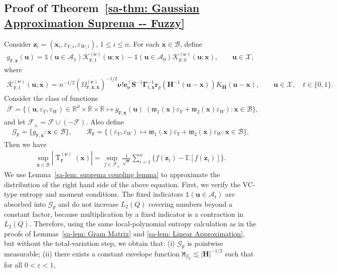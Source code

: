 \documentclass[10pt]{article}
\DeclareMathOperator{\Tstat}{T}
\newcommand{\E}{\mathbb{E}}
\newcommand{\Indicator}{\mathds{1}}
\newcommand{\reals}{\mathbb{R}}
\newcommand{\be}{\mathbf{e}}
\newcommand{\bH}{\mathbf{H}}
\newcommand{\br}{\mathbf{r}}
\newcommand{\bS}{\mathbf{S}}
\newcommand{\bu}{\mathbf{u}}
\newcommand{\bx}{\mathbf{x}}
\newcommand{\bz}{\mathbf{z}}
\newcommand{\bnu}{\boldsymbol{\nu}}
\newcommand{\bGamma}{\boldsymbol{\Gamma}}
\newcommand{\A}{\mathcal{A}}
\newcommand{\B}{\mathcal{B}}
\newcommand{\F}{\mathcal{F}}
\newcommand{\G}{\mathcal{G}}
\newcommand{\K}{\mathscr{K}}
\newcommand{\R}{\mathcal{R}}
\newcommand{\X}{\mathcal{X}}
\newcommand{\ttF}{\mathtt{F}}
\newcommand{\ttM}{\mathtt{M}}
\begin{document}
\subsection{Proof of Theorem~\ref{sa-thm: Gaussian Approximation Suprema -- Fuzzy}}
Consider $\bz_i = (\bx_i, \varepsilon_{Y,i}, \varepsilon_{W,i})$, $1 \leq i \leq n$. For each $\bx \in \B$, define
\begin{align*}
    g_{\ttF, \bx}(\bu) = \Indicator(\bu \in \A_1)  \K^{(\bnu)}_{\ttF,1}(\bu;\bx) - \Indicator(\bu \in \A_0) \K^{(\bnu)}_{\ttF,0}(\bu;\bx),
    \qquad \bu \in \X,
\end{align*}
where
\begin{align*}
    \K^{(\bnu)}_{\ttF, t}(\bu;\bx) = n^{-1/2} (\Omega_{\ttF, \bx,\bx}^{(\bnu)})^{-1/2}\bnu!\be_{\bnu}^{\top} \bS^{-1} \bGamma_{t,\bx}^{-1} \br_p(\bH^{-1}(\bu - \bx)) K_{\bH}(\bu - \bx), \qquad \bu \in \X,\quad t \in \{0,1\}.
\end{align*}
Consider the class of functions
\begin{align*}
    \F = \{(\bu, \varepsilon_Y, \varepsilon_W) \in \reals^{d} \times \reals \times \reals \mapsto g_{\ttF, \bx}(\bu) \; (\mathfrak{w}_1(\bx)\varepsilon_{Y}+\mathfrak{w}_2(\bx)\varepsilon_{W}): \bx \in \B\},
\end{align*}
and let $\F_{\pm}=\F\cup(-\F)$. Also define
\begin{gather*}
    \G_{\ttF} = \{g_{\ttF, \bx}: \bx \in \B \}, \qquad
    \R_{\ttF} = \{(\varepsilon_Y, \varepsilon_W) \mapsto \mathfrak{w}_1(\bx)\varepsilon_{Y}+\mathfrak{w}_2(\bx)\varepsilon_{W}: \bx \in \B\}.
\end{gather*}
Then we have
\begin{align*}
    \sup_{\bx \in \B} |\overline{\Tstat}^{(\bnu)}_{\mathtt{F}}(\bx)| = \sup_{f \in \F_{\pm}} \frac{1}{\sqrt{n}} \sum_{i = 1}^n \Big\{f(\bz_i) - \E[f(\bz_i)]\Big\}.
\end{align*}
We use Lemma~\ref{sa-lem: suprema coupling lemma} to approximate the distribution of the right hand side of the above equation. First, we verify the VC-type entropy and moment conditions. The fixed indicators $\Indicator(\bu\in\A_t)$ are absorbed into $\G_{\ttF}$ and do not increase $L_2(Q)$ covering numbers beyond a constant factor, because multiplication by a fixed indicator is a contraction in $L_2(Q)$. Therefore, using the same local-polynomial entropy calculation as in the proofs of Lemmas~\ref{sa-lem: Gram Matrix} and \ref{sa-lem: Linear Approximation}, but without the total-variation step, we obtain that: (i) $\G_{\ttF}$ is pointwise measurable; (ii) there exists a constant envelope function $\ttM_{\G_{\ttF}} \lesssim |\bH|^{-1/2}$ such that for all $0 < \varepsilon < 1$,
\end{document}
